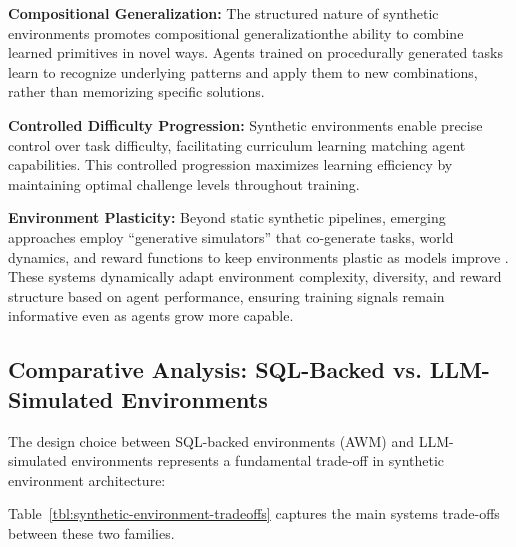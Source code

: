 \textbf{Compositional Generalization:} The structured nature of synthetic environments promotes compositional generalizationthe ability to combine learned primitives in novel ways. Agents trained on procedurally generated tasks learn to recognize underlying patterns and apply them to new combinations, rather than memorizing specific solutions.

\textbf{Controlled Difficulty Progression:} Synthetic environments enable precise control over task difficulty, facilitating curriculum learning matching agent capabilities. This controlled progression maximizes learning efficiency by maintaining optimal challenge levels throughout training.

\textbf{Environment Plasticity:} Beyond static synthetic pipelines, emerging approaches employ ``generative simulators'' that co-generate tasks, world dynamics, and reward functions to keep environments plastic as models improve \citep{patronusai2025plasticity}. These systems dynamically adapt environment complexity, diversity, and reward structure based on agent performance, ensuring training signals remain informative even as agents grow more capable.

\subsection{Comparative Analysis: SQL-Backed vs. LLM-Simulated Environments}

The design choice between SQL-backed environments (AWM) and LLM-simulated environments represents a fundamental trade-off in synthetic environment architecture:

Table~\ref{tbl:synthetic-environment-tradeoffs} captures the main systems trade-offs between these two families.

